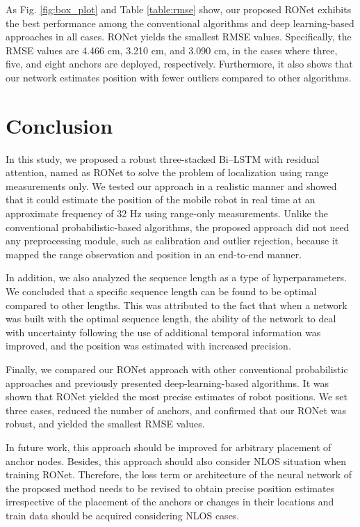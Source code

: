 \documentclass[letterpaper, 10 pt, conference]{ieeeconf}
\begin{document}
As Fig. \ref{fig:box_plot} and Table \ref{table:rmse} show, our proposed RONet exhibits the best performance among the conventional algorithms and deep learning-based approaches in all cases. RONet yields the smallest RMSE values. Specifically, the RMSE values are 4.466 cm, 3.210 cm, and 3.090 cm, in the cases where three, five, and eight anchors are deployed, respectively. Furthermore, it also shows that our network estimates position with fewer outliers compared to other algorithms. 

\section{Conclusion}

In this study, we proposed a robust three-stacked Bi--LSTM with residual attention, named as RONet to solve the problem of localization using range measurements only. We tested our approach in a realistic manner and showed that it could estimate the position of the mobile robot in real time at an approximate frequency of 32 Hz using range-only measurements. Unlike the conventional probabilistic-based algorithms, the proposed approach did not need any preprocessing module, such as calibration and outlier rejection, because it mapped the range observation and position in an end-to-end manner.

In addition, we also analyzed the sequence length as a type of hyperparameters. We concluded that a specific sequence length can be found to be optimal compared to other lengths. This was attributed to the fact that when a network was built with the optimal sequence length, the ability of the network to deal with uncertainty following the use of additional temporal information was improved, and the position was estimated with increased precision.

Finally, we compared our RONet approach with other conventional probabilistic approaches and previously presented deep-learning-based algorithms. It was shown that RONet yielded the most precise estimates of robot positions. We set three cases, reduced the number of anchors, and confirmed that our RONet was robust, and yielded the smallest RMSE values. 

In future work, this approach should be improved for arbitrary placement of anchor nodes. Besides, this approach should also consider NLOS situation when training RONet. Therefore, the loss term or architecture of the neural network of the proposed method needs to be revised to obtain precise position estimates irrespective of the placement of the anchors or changes in their locations and train data should be acquired considering NLOS cases.



\end{document}
